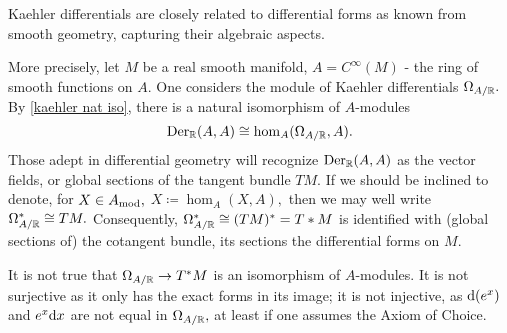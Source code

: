 \begin{note}
  Kaehler differentials are closely related to differential forms as known from smooth geometry, capturing their algebraic aspects.

  More precisely, let \(M\) be a real smooth manifold, \(A = C^\infty(M)\) - the ring of smooth functions on \(A.\) One considers the module of Kaehler differentials \(\Omega_{A/{\mathbb R}}.\) By \cref{kaehler nat iso}, there is a natural isomorphism of \(A\)-modules
  \[\operatorname{Der}_\mathbb R(A, A) \cong \hom_A(\Omega_{A/{\mathbb R}}, A).\]
  Those adept in differential geometry will recognize \(\operatorname{Der}_\mathbb R(A, A)\) as the vector fields, or global sections of the tangent bundle \(TM.\) If we should be inclined to denote, for \(X \in {A}_\mathrm{mod},\) \(X \coloneqq \hom_A(X, A),\) then we may well write \(\Omega_{A/{\mathbb R}}^{*} \cong TM.\)
  Consequently, \(\Omega_{A/{\mathbb R}}^* \cong (TM)^* = T*M\) is identified with (global sections of) the cotangent bundle, its sections the differential forms on \(M.\)

  It is not true that \(\Omega_{A/{\mathbb R}} \to T^*M\) is an isomorphism of \(A\)-modules. It is not surjective as it only has the exact forms in its image; it is not injective, as \(\text{d}(e^x)\) and \(e^x \text{d} x\) are not equal in \(\Omega_{A/{\mathbb R}},\) at least if one assumes the Axiom of Choice. \cite{MO}
\end{note}












